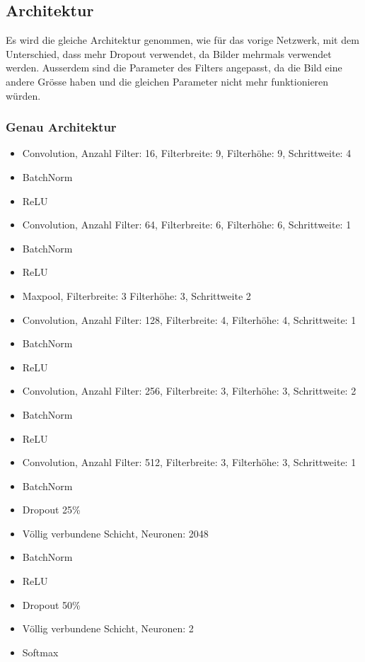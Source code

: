 \documentclass[12pt,a4paper]{report}
\begin{document}
\subsection{Architektur}
Es wird die gleiche Architektur genommen, wie für das vorige Netzwerk, mit dem Unterschied,
dass mehr Dropout verwendet, da Bilder mehrmals verwendet werden.
Ausserdem sind die Parameter des Filters angepasst, da die Bild eine andere Grösse haben und die gleichen Parameter nicht mehr funktionieren würden.
\subsubsection{Genau Architektur}

\begin{itemize}
    \setlength\itemsep{0cm}
    \setlength{\parskip}{0pt}
    \setlength{\parsep}{0pt}
    \item Convolution, Anzahl Filter: 16, Filterbreite: 9, Filterhöhe: 9, Schrittweite: 4
    \item BatchNorm
    \item ReLU
    \item Convolution, Anzahl Filter: 64, Filterbreite: 6, Filterhöhe: 6, Schrittweite: 1
    \item BatchNorm
    \item ReLU
    \item Maxpool, Filterbreite: 3 Filterhöhe: 3, Schrittweite 2
    \item Convolution, Anzahl Filter: 128, Filterbreite: 4, Filterhöhe: 4, Schrittweite: 1
    \item BatchNorm
    \item ReLU
    \item Convolution, Anzahl Filter: 256, Filterbreite: 3, Filterhöhe: 3, Schrittweite: 2
    \item BatchNorm
    \item ReLU
    \item Convolution, Anzahl Filter: 512, Filterbreite: 3, Filterhöhe: 3, Schrittweite: 1
    \item BatchNorm
    \item Dropout 25\%
    \item Völlig verbundene Schicht, Neuronen: 2048
    \item BatchNorm
    \item ReLU
    \item Dropout 50\%
    \item Völlig verbundene Schicht, Neuronen: 2
    \item Softmax
\end{itemize}
\end{document}
